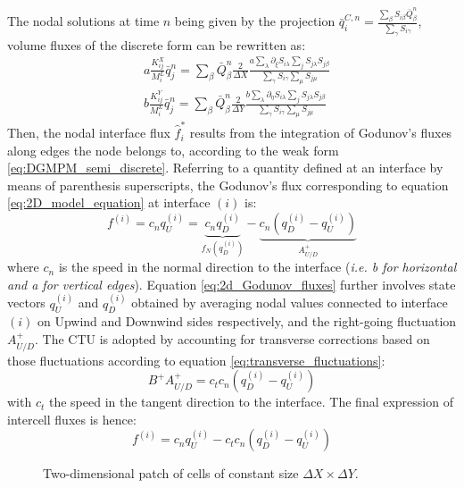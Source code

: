 The nodal solutions at time $n$ being given by the projection $\bar{q}^{C,n}_i=\frac{\sum_\beta S_{i\beta}\bar{Q}^n_\beta}{\sum_\gamma S_{i\gamma}}$, volume fluxes of the discrete form can be rewritten as:
\begin{equation}
  \label{eq:2Dvolume_fluxes}
  \begin{aligned}
    & a\frac{K_{ij}^X}{M_i^L}\bar{q}^n_j  = \sum_\beta \bar{Q}^n_\beta \frac{2}{\Delta X} \frac{a\sum_\lambda\partial_\xi S_{i\lambda}  \sum_j S_{j\lambda} S_{j\beta}}{\sum_\gamma  S_{i\gamma}\sum_\mu S_{j\mu}}\\
    & b\frac{K_{ij}^Y}{M_i^L}\bar{q}^n_j = \sum_\beta \bar{Q}^n_\beta\frac{2}{\Delta Y}  \frac{b \sum_\lambda\partial_\eta S_{i\lambda}  \sum_j S_{j\lambda} S_{j\beta}}{\sum_\gamma  S_{i\gamma}\sum_\mu S_{j\mu}}
  \end{aligned}
\end{equation}
Then, the nodal interface flux $\hat{f}_i^{*}$ results from the integration of Godunov's fluxes along edges the node belongs to, according to the weak form \eqref{eq:DGMPM_semi_discrete}.
Referring to a quantity defined at an interface by means of parenthesis superscripts, the Godunov's flux corresponding to equation \eqref{eq:2D_model_equation} at interface $(i)$ is:
\begin{equation}
  \label{eq:2d_Godunov_fluxes}
  f^{(i)}= c_n q^{(i)}_U = \underbrace{c_nq^{(i)}_D}_{f_N(q^{(i)}_D)} - \underbrace{c_n (q^{(i)}_D -q^{(i)}_U)}_{A^{+}_{U/D}} 
\end{equation}
where $c_n$ is the speed in the normal direction to the interface (\textit{i.e. b for horizontal and a for vertical edges}). Equation \eqref{eq:2d_Godunov_fluxes} further involves state vectors $q^{(i)}_U$ and $q^{(i)}_D$ obtained by averaging nodal values connected to interface $(i)$ on Upwind and Downwind sides respectively, and the right-going fluctuation $A_{U/D}^+$.
The CTU is adopted by accounting for transverse corrections based on those fluctuations according to equation \eqref{eq:transverse_fluctuations}:
\begin{equation}
  \label{eq:2D_transverse_corrections}
  B^+A^+_{U/D}=c_t c_n (q^{(i)}_D -q^{(i)}_U)
\end{equation}
with $c_t$ the speed in the tangent direction to the interface. The final expression of intercell fluxes is hence:
\begin{equation}
  \label{eq:CTU-fluxes}
  f^{(i)}= c_n q^{(i)}_U - c_t c_n (q^{(i)}_D -q^{(i)}_U)
\end{equation}
\begin{figure}[h!]
  \centering
  
  \caption{Two-dimensional patch of cells of constant size $\Delta X \times \Delta Y$.}\label{fig:2Dmesh}
\end{figure}
